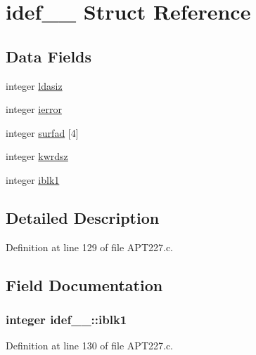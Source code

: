 \hypertarget{structidef__1__}{}\section{idef\+\_\+\_\+ Struct Reference}
\label{structidef__1__}
\subsection*{Data Fields}
\begin{DoxyCompactItemize}
\item 
integer \hyperlink{structidef__1___acef5d4b0e87c383243d031727bee56fe}{ldasiz}
\item 
integer \hyperlink{structidef__1___a32d73a01b8164649d8426d05b6bf89b8}{ierror}
\item 
integer \hyperlink{structidef__1___ac94153f7cdfe5da1dcf8ee3efce9726c}{surfad} \mbox{[}4\mbox{]}
\item 
integer \hyperlink{structidef__1___af8f2880406b732e94ecc1363b9c4c7ae}{kwrdsz}
\item 
integer \hyperlink{structidef__1___a5443b03f47a128396904edc694ba7f00}{iblk1}
\end{DoxyCompactItemize}


\subsection{Detailed Description}


Definition at line 129 of file A\+P\+T227.\+c.



\subsection{Field Documentation}
\subsubsection[{\texorpdfstring{iblk1}{iblk1}}]{\setlength{\rightskip}{0pt plus 5cm}integer idef\+\_\+\_\+\+::iblk1}\hypertarget{structidef__1___a5443b03f47a128396904edc694ba7f00}{}\label{structidef__1___a5443b03f47a128396904edc694ba7f00}


Definition at line 130 of file A\+P\+T227.\+c.

